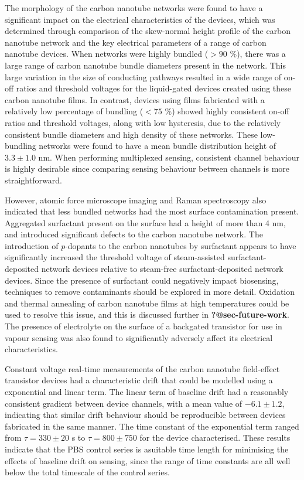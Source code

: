 \documentclass[
  a4paper,
]{scrbook}
\begin{document}
The morphology of the carbon nanotube networks were found to have a
significant impact on the electrical characteristics of the devices,
which was determined through comparison of the skew-normal height
profile of the carbon nanotube network and the key electrical parameters
of a range of carbon nanotube devices. When networks were highly bundled
(\(>90\) \%), there was a large range of carbon nanotube bundle
diameters present in the network. This large variation in the size of
conducting pathways resulted in a wide range of on-off ratios and
threshold voltages for the liquid-gated devices created using these
carbon nanotube films. In contrast, devices using films fabricated with
a relatively low percentage of bundling (\(<75\) \%) showed highly
consistent on-off ratios and threshold voltages, along with low
hysteresis, due to the relatively consistent bundle diameters and high
density of these networks. These low-bundling networks were found to
have a mean bundle distribution height of \(3.3 \pm 1.0\) nm. When
performing multiplexed sensing, consistent channel behaviour is highly
desirable since comparing sensing behaviour between channels is more
straightforward.

However, atomic force microscope imaging and Raman spectroscopy also
indicated that less bundled networks had the most surface contamination
present. Aggregated surfactant present on the surface had a height of
more than 4 nm, and introduced significant defects to the carbon
nanotube network. The introduction of \(p\)-dopants to the carbon
nanotubes by surfactant appears to have significantly increased the
threshold voltage of steam-assisted surfactant-deposited network devices
relative to steam-free surfactant-deposited network devices. Since the
presence of surfactant could negatively impact biosensing, techniques to
remove contaminants should be explored in more detail. Oxidation and
thermal annealing of carbon nanotube films at high temperatures could be
used to resolve this issue, and this is discussed further in
\textbf{?@sec-future-work}. The presence of electrolyte on the surface
of a backgated transistor for use in vapour sensing was also found to
significantly adversely affect its electrical characteristics.

Constant voltage real-time measurements of the carbon nanotube
field-effect transistor devices had a characteristic drift that could be
modelled using a exponential and linear term. The linear term of
baseline drift had a reasonably consistent gradient between device
channels, with a mean value of \(-6.1 \pm 1.2\), indicating that similar
drift behaviour should be reproducible between devices fabricated in the
same manner. The time constant of the exponential term ranged from
\(\tau = 330 \pm 20\) s to \(\tau = 800 \pm 750\) for the device
characterised. These results indicate that the PBS control series is
asuitable time length for minimising the effects of baseline drift on
sensing, since the range of time constants are all well below the total
timescale of the control series.
\end{document}
